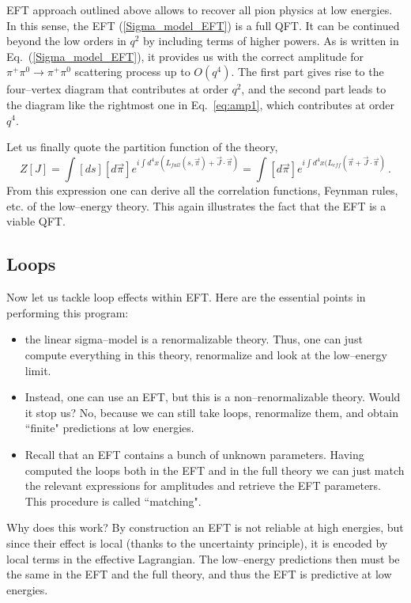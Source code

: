 \documentclass[11pt,a4paper]{article}
\newcommand{\be}{\begin{equation}}
\newcommand{\ee}{\end{equation}}
\begin{document}
EFT approach outlined above allows to recover all pion physics at low energies. In this sense, the EFT (\ref{Sigma_model_EFT}) is a full QFT. It can be continued beyond the low orders in $q^2$ by including terms of higher powers. As is written in Eq.~(\ref{Sigma_model_EFT}), it provides us with the correct amplitude for $\pi^+\pi^0\rightarrow \pi^+\pi^0$ scattering process up to $O(q^4)$. The first part gives rise to the four--vertex diagram that contributes at order $q^2$, and the second part leads to the diagram like the rightmost one in Eq.~\eqref{eq:amp1}, which contributes at order~$q^4$.

Let us finally quote the partition function of the theory,
\be
Z[J]=\int [ds][d\vec{\pi}]e^{i\int d^4x(L_{full}(s,\vec{\pi})+\vec{J}\cdot\vec{\pi})}=\int [d\vec{\pi}]e^{i\int d^4x(L_{eff}(\vec{\pi}+\vec{J}\cdot\vec{\pi})}\,.
\ee
From this expression one can derive all the correlation functions, Feynman rules, etc. of the low--energy theory. This again illustrates the fact that the EFT is a viable QFT.


\subsection{Loops}

Now let us tackle loop effects within EFT.
Here are the essential points in performing this program:
\begin{itemize}
\item the linear sigma--model is a renormalizable theory. Thus, one can just compute everything in this theory, renormalize and look at the low--energy limit.
\item Instead, one can use an EFT, but this is a non--renormalizable theory. Would it stop us? No, because we can still take loops, renormalize them, and obtain ``finite" predictions at low energies.
\item Recall that an EFT contains a bunch of unknown parameters.
Having computed the loops both in the EFT and in the full theory we can just match the relevant expressions for amplitudes and retrieve the EFT parameters. This procedure is called ``matching".
\end{itemize}


Why does this work?
By construction an EFT is not reliable at high energies, but since their effect is local
(thanks to the uncertainty principle), it is encoded by local terms in the effective Lagrangian.
The low--energy predictions then must be the same in the EFT and the full theory, and thus the EFT
is predictive at low energies.
\end{document}
